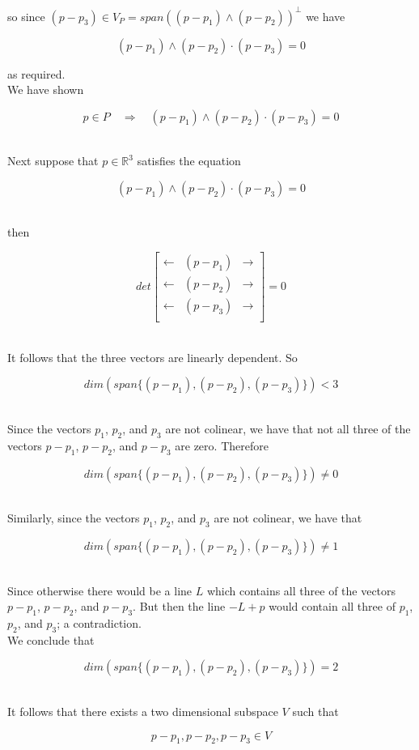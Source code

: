 \documentclass[12pt,letterpaper]{hmcpset}
\begin{document}
\begin{solution}
so since $(p-p_3) \in V_P=span((p-p_1)\wedge(p-p_2) )^{\bot}$ we have

\[ (p-p_1)\wedge(p-p_2)\cdot(p-p_3) = 0 \]

as required.\\

We have shown

\[ p \in P \quad \Rightarrow \quad  (p-p_1)\wedge(p-p_2)\cdot(p-p_3) = 0 \]\\

\newpage

Next suppose that $p \in \mathbb{R}^3$ satisfies the equation

\[ (p-p_1)\wedge(p-p_2)\cdot(p-p_3) = 0 \]\

then

\begin{equation*}
det
\left[
\begin{matrix}
\leftarrow & (p-p_1) & \rightarrow\\
 \leftarrow & (p-p_2) & \rightarrow\\
\leftarrow &  (p-p_3)& \rightarrow\\
\end{matrix}
\right] 
=0
\end{equation*}\

It follows that the three vectors are linearly dependent.  So 

\[ dim(span\{(p-p_1),(p-p_2),(p-p_3)\}) <3 \]\

Since the vectors $p_1$, $p_2$, and $p_3$ are not colinear, we have that not all three of the vectors $p-p_1$, $p-p_2$, and $p-p_3$ are zero.  Therefore

 \[ dim(span\{(p-p_1),(p-p_2),(p-p_3)\}) \neq 0 \]\

Similarly, since the vectors $p_1$, $p_2$, and $p_3$ are not colinear, we have that

 \[ dim(span\{(p-p_1),(p-p_2),(p-p_3)\}) \neq 1 \]\

Since otherwise there would be a line $L$ which contains all  three of the vectors $p-p_1$, $p-p_2$, and $p-p_3$.  But then the line 
$-L +p$ would contain all three of $p_1$, $p_2$, and $p_3$; a contradiction.\\

We conclude that 

 \[ dim(span\{(p-p_1),(p-p_2),(p-p_3)\}) =2  \]\

It follows that there exists a two dimensional subspace $V$ such that 

\[ p-p_1, p-p_2, p-p_3 \in V\]\


\end{solution}
\end{document}
